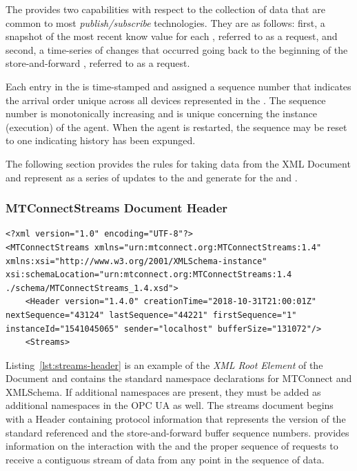 The   provides two capabilities with respect to the collection of data that are common to most \textit{publish/subscribe} technologies. They are as follows: first, a snapshot of the most recent know value for each , referred to as a  request, and second, a time-series of changes that occurred going back to the beginning of the store-and-forward , referred to as a  request.

Each entry in the  is time-stamped and assigned a sequence number that indicates the arrival order unique across all devices represented in the . The sequence number is monotonically increasing and is unique concerning the instance (execution) of the agent. When the agent is restarted, the sequence may be reset to one indicating history has been expunged. 

The following section provides the rules for taking data from the  XML Document and represent as a series of updates to the  and generate  for the  and  .

\subsubsection{MTConnectStreams Document Header}

\begin{lstlisting}[firstnumber=1,escapechar=|,%
    caption={Streams Header},label={lst:streams-header}]
<?xml version="1.0" encoding="UTF-8"?>
<MTConnectStreams xmlns="urn:mtconnect.org:MTConnectStreams:1.4" xmlns:xsi="http://www.w3.org/2001/XMLSchema-instance" xsi:schemaLocation="urn:mtconnect.org:MTConnectStreams:1.4 ./schema/MTConnectStreams_1.4.xsd">
	<Header version="1.4.0" creationTime="2018-10-31T21:00:01Z" nextSequence="43124" lastSequence="44221" firstSequence="1" instanceId="1541045065" sender="localhost" bufferSize="131072"/>
	<Streams>
\end{lstlisting}

Listing~\ref{lst:streams-header} is an example of the \textit{XML Root Element} of the  Document and contains the standard namespace declarations for MTConnect and XMLSchema. If additional namespaces are present, they must be added as additional namespaces in the OPC UA  as well. The streams document begins with a Header containing protocol information that represents the version of the standard referenced and the store-and-forward buffer sequence numbers. \cite{MTCPart1} provides information on the interaction with the  and the proper sequence of requests to receive a contiguous stream of data from any point in the sequence of data.

